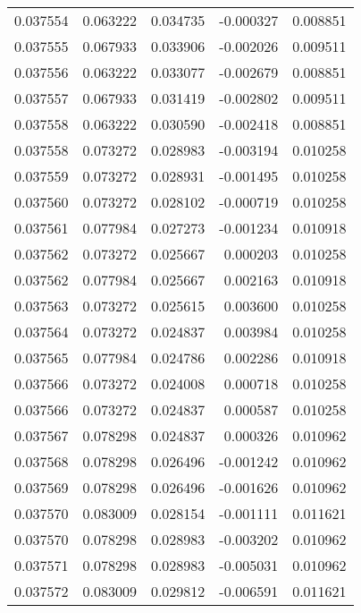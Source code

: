 \begin{tabular}{lrrrr}
0.037554    &  0.063222 &  0.034735 & -0.000327 &             0.008851 \\
0.037555    &  0.067933 &  0.033906 & -0.002026 &             0.009511 \\
0.037556    &  0.063222 &  0.033077 & -0.002679 &             0.008851 \\
0.037557    &  0.067933 &  0.031419 & -0.002802 &             0.009511 \\
0.037558    &  0.063222 &  0.030590 & -0.002418 &             0.008851 \\
0.037558    &  0.073272 &  0.028983 & -0.003194 &             0.010258 \\
0.037559    &  0.073272 &  0.028931 & -0.001495 &             0.010258 \\
0.037560    &  0.073272 &  0.028102 & -0.000719 &             0.010258 \\
0.037561    &  0.077984 &  0.027273 & -0.001234 &             0.010918 \\
0.037562    &  0.073272 &  0.025667 &  0.000203 &             0.010258 \\
0.037562    &  0.077984 &  0.025667 &  0.002163 &             0.010918 \\
0.037563    &  0.073272 &  0.025615 &  0.003600 &             0.010258 \\
0.037564    &  0.073272 &  0.024837 &  0.003984 &             0.010258 \\
0.037565    &  0.077984 &  0.024786 &  0.002286 &             0.010918 \\
0.037566    &  0.073272 &  0.024008 &  0.000718 &             0.010258 \\
0.037566    &  0.073272 &  0.024837 &  0.000587 &             0.010258 \\
0.037567    &  0.078298 &  0.024837 &  0.000326 &             0.010962 \\
0.037568    &  0.078298 &  0.026496 & -0.001242 &             0.010962 \\
0.037569    &  0.078298 &  0.026496 & -0.001626 &             0.010962 \\
0.037570    &  0.083009 &  0.028154 & -0.001111 &             0.011621 \\
0.037570    &  0.078298 &  0.028983 & -0.003202 &             0.010962 \\
0.037571    &  0.078298 &  0.028983 & -0.005031 &             0.010962 \\
0.037572    &  0.083009 &  0.029812 & -0.006591 &             0.011621 \\

\end{tabular}
